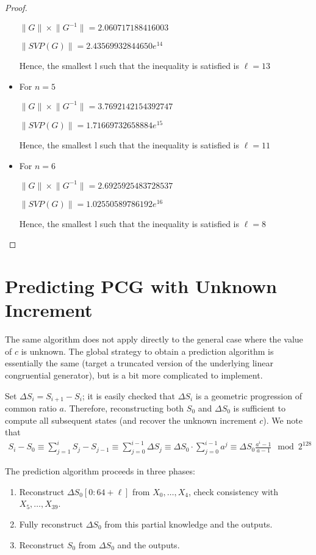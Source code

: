 \documentclass[preprint,svgnames]{iacrtrans}
\begin{document}
\begin{proof}
\begin{itemize}
	\(\lVert G \rVert \times \lVert G^{-1} \rVert = 2.060717188416003\)
	
	\(\lVert SVP(G) \rVert = 2.43569932844650e^{14}\)
	
	Hence, the smallest l such that the inequality is satisfied is \(\ell = 13\) %
	
	\item For \(n=5\)
	
	\(\lVert G \rVert \times \lVert G^{-1} \rVert = 3.7692142154392747\)
	
	\(\lVert SVP(G) \rVert = 1.71669732658884e^{15}\)
	
	Hence, the smallest l such that the inequality is satisfied is \(\ell = 11\)  %
	
	\item For \(n=6\)
	
	\(\lVert G \rVert \times \lVert G^{-1} \rVert = 2.6925925483728537\)
	
	\(\lVert SVP(G) \rVert =1.02550589786192e^{16}\)
	
	Hence, the smallest l such that the inequality is satisfied is \(\ell = 8\) %
\end{itemize}
\end{proof}


\section{Predicting PCG with Unknown Increment}
\label{sec:Cunknown}

The same algorithm does not apply directly to the general case where the value
of $c$ is unknown. The global strategy to obtain a prediction algorithm is
essentially the same (target a truncated version of the underlying linear
congruential generator), but is a bit more complicated to implement.

Set $\Delta S_i = S_{i+1} - S_i$; it is easily checked that $\Delta S_i$ is a
geometric progression of common ratio $a$. Therefore, reconstructing both $S_0$
and $\Delta S_0$ is sufficient to compute all subsequent states (and recover the
unknown increment $c$). We note that
\begin{align*}
  S_i - S_0 \equiv \sum_{j=1}^i S_j - S_{j-1} \equiv \sum_{j=0}^{i-1} \Delta S_j \equiv \Delta S_0 \cdot \sum_{j=0}^{i-1} a^j \equiv \Delta S_0 \frac{a^i-1}{a-1} \mod 2^{128}
\end{align*}

The prediction algorithm proceeds in three phases:
\begin{enumerate}
\item Reconstruct $\Delta S_0[0:64+\ell]$ from $X_0, \dots, X_{4}$, check consistency with $X_5, \dots, X_{39}$.
\item Fully reconstruct $\Delta S_0$ from this partial knowledge and the outputs.
\item Reconstruct $S_0$ from $\Delta S_0$ and the outputs.
\end{enumerate}
\end{document}
